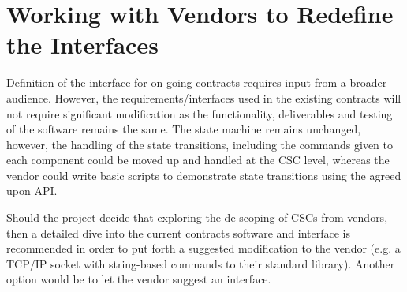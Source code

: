 \documentclass[TS,authoryear,toc]{lsstdoc}
\begin{document}
\section{Working with Vendors to Redefine the Interfaces}
Definition of the interface for on-going contracts requires input from a broader audience. However, the requirements/interfaces used in the existing contracts will not require significant modification as the functionality, deliverables and testing of the software remains the same. The state machine remains unchanged, however, the handling of the state transitions, including the commands given to each component could be moved up and handled at the CSC level, whereas the vendor could write basic scripts to demonstrate state transitions using the agreed upon API. 

Should the project decide that exploring the de-scoping of CSCs from vendors, then a detailed dive into the current contracts software and interface is recommended in order to put forth a suggested modification to the vendor (e.g. a TCP/IP socket with string-based commands to their standard library). Another option would be to let the vendor suggest an interface.

\newpage

\appendix

% 

% 
\end{document}
